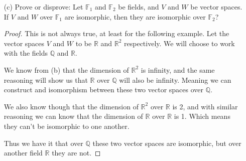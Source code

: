 \documentclass[12pt]{article}
\newcommand      {\Qm}         {{\mathbb Q}}
\newcommand      {\Rm}         {{\mathbb R}}
\newcommand      {\Fm}          {{\mathbb F}}
\begin{document}
\begin{itemize}
\begin{itemize}
\begin{proof}
            Then through definition the set \[\left\{(1,0),\ (e,0),\ \dots,\ (e^n,0)\right\}\] is a set of linearly independent vectors, and there is $n+1$ of them.
            
            We know though that if a vector space has dimension $N$ then any set of linearly independent vectors in that vector space will have at most $N$ vectors. This is where the issue comes, because above we just defined a set of linearly independent vectors in the vector space $\Rm^2$ over $\Qm$ that contains $n+1$ vectors for any non zero natural number $n$. Therefore $\Rm^2$ over $\Qm$ cannot be of finite dimension nor countably infinite dimension, and therefore has an uncountable infinite dimension. 


        \end{proof}

        \item[(c)] Prove or disprove: Let $\Fm_1$ and $\Fm_2$ be fields, and $V$ and $W$ be vector spaces. If $V$ and $W$ over $\Fm_1$ are isomorphic, then they are isomorphic over $\Fm_2$?
        \begin{proof}
            This is not always true, at least for the following example. Let the vector spaces $V$ and $W$ to be $\Rm$ and $\Rm^2$ respectively. We will choose to work with the fields $\Qm$ and $\Rm$.
            
            We know from (b) that the dimension of $\Rm^2$ is infinity, and the same reasoning will show us that $\Rm$ over $\Qm$ will also be infinity. Meaning we can construct and isomorphism between these two vector spaces over $\Qm$. 

            We also know though that the dimension of $\Rm^2$ over $\Rm$ is 2, and with similar reasoning we can know that the dimension of $\Rm$ over $\Rm$ is 1. Which means they can't be isomorphic to one another. 
            
            Thus we have it that over $\Qm$ these two vector spaces are isomorphic, but over another field $\Rm$ they are not.
        \end{proof} 
    \end{itemize}
\end{itemize}
\end{document}
